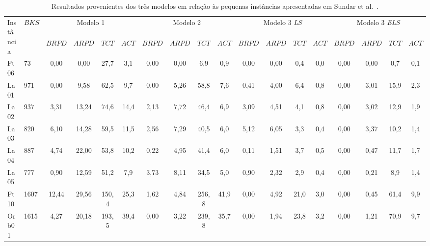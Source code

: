 \begin{landscape}
\begin{table}[H]
\caption{Resultados provenientes dos três modelos em relação às pequenas instâncias apresentadas em Sundar et al.~\cite{sundarHybridArtificialBee2017}.}
\label{tab:P1_instan}
\setlength{\tabcolsep}{3pt} %
\begin{tabular}{ll|cccc|cccc|cccc|cccc}
\multirow{2}{*}{Instância} & \multirow{2}{*}{$BKS$} & \multicolumn{4}{c|}{Modelo 1}   & \multicolumn{4}{c|}{Modelo 2}   & \multicolumn{4}{c|}{Modelo 3 \textit{LS}} & \multicolumn{4}{c}{Modelo 3 \textit{ELS}} \\
                           &                        & $BRPD$ & $ARPD$ & $TCT$ & $ACT$ & $BRPD$ & $ARPD$ & $TCT$ & $ACT$ & $BRPD$  & $ARPD$ & $TCT$ & $ACT$ & $BRPD$  & $ARPD$ & $TCT$ & $ACT$ \\ \hline
Ft06                       & 73                     & 0,00   & 0,00   & 27,7  & 3,1   & 0,00   & 0,00   & 6,9   & 0,9   & 0,00    & 0,00   & 0,4   & 0,0   & 0,00    & 0,00   & 0,7   & 0,1   \\
La01                       & 971                    & 0,00   & 9,58   & 62,5  & 9,7   & 0,00   & 5,26   & 58,8  & 7,6   & 0,41    & 4,00   & 6,4   & 0,8   & 0,00    & 3,01   & 15,9  & 2,3   \\
La02                       & 937                    & 3,31   & 13,24  & 74,6  & 14,4  & 2,13   & 7,72   & 46,4  & 6,9   & 3,09    & 4,51   & 4,1   & 0,8   & 0,00    & 3,02   & 12,9  & 1,9   \\
La03                       & 820                    & 6,10   & 14,28  & 59,5  & 11,5  & 2,56   & 7,29   & 40,5  & 6,0   & 5,12    & 6,05   & 3,3   & 0,4   & 0,00    & 3,37   & 10,2  & 1,4   \\
La04                       & 887                    & 4,74   & 22,00  & 53,8  & 10,2  & 0,22   & 4,95   & 41,4  & 6,0   & 0,11    & 1,51   & 3,7   & 0,5   & 0,00    & 0,47   & 11,7  & 1,7   \\
La05                       & 777                    & 0,90   & 12,59  & 51,2  & 7,9   & 3,73   & 8,11   & 34,5  & 5,0   & 0,90    & 2,32   & 2,9   & 0,4   & 0,00    & 0,21   & 8,9   & 1,4   \\
Ft10                       & 1607                   & 12,44  & 29,56  & 150,4 & 25,3  & 1,62   & 4,84   & 256,8 & 41,9  & 0,00    & 4,92   & 21,0  & 3,0   & 0,00    & 0,45   & 61,4  & 9,9   \\
Orb01                      & 1615                   & 4,27   & 20,18  & 193,5 & 39,4  & 0,00   & 3,22   & 239,8 & 35,7  & 0,00    & 1,94   & 23,8  & 3,2   & 0,00    & 1,21   & 70,9  & 9,7   \\

\end{tabular}
\end{table}
\end{landscape}
